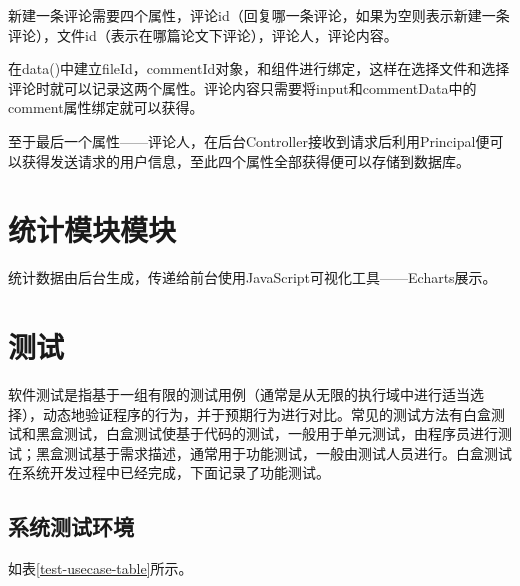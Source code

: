 新建一条评论需要四个属性，评论id（回复哪一条评论，如果为空则表示新建一条评论），文件id（表示在哪篇论文下评论），评论人，评论内容。

在data()中建立fileId，commentId对象，和组件进行绑定，这样在选择文件和选择评论时就可以记录这两个属性。评论内容只需要将input和commentData中的comment属性绑定就可以获得。

至于最后一个属性——评论人，在后台Controller接收到请求后利用Principal便可以获得发送请求的用户信息，至此四个属性全部获得便可以存储到数据库。

\section{统计模块模块}

统计数据由后台生成，传递给前台使用JavaScript可视化工具——Echarts展示。

\section{测试}

软件测试是指基于一组有限的测试用例（通常是从无限的执行域中进行适当选择），动态地验证程序的行为，并于预期行为进行对比\cite{.software}。常见的测试方法有白盒测试和黑盒测试，白盒测试使基于代码的测试，一般用于单元测试，由程序员进行测试；黑盒测试基于需求描述，通常用于功能测试，一般由测试人员进行。白盒测试在系统开发过程中已经完成，下面记录了功能测试。

\subsection{系统测试环境}

如表\ref{test-usecase-table}所示。

